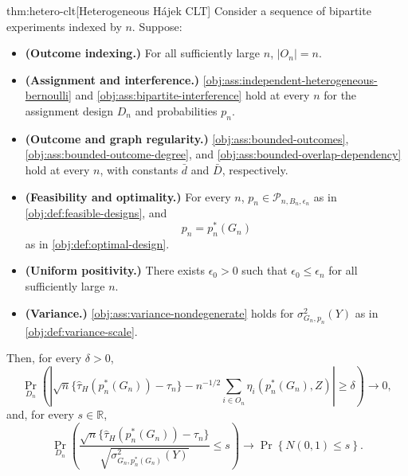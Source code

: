 \begin{theoremv}{thm:hetero-clt}[Heterogeneous Hájek CLT]
Consider a sequence of bipartite experiments indexed by $n$. Suppose:
\begin{itemize}
\item \textbf{(Outcome indexing.)} For all sufficiently large $n$, $|O_n|=n$.
\item \textbf{(Assignment and interference.)} \cref{obj:ass:independent-heterogeneous-bernoulli} and \cref{obj:ass:bipartite-interference} hold at every $n$ for the assignment design $D_n$ and probabilities $p_n$.
\item \textbf{(Outcome and graph regularity.)} \cref{obj:ass:bounded-outcomes}, \cref{obj:ass:bounded-outcome-degree}, and \cref{obj:ass:bounded-overlap-dependency} hold at every $n$, with constants $\bar d$ and $\bar D$, respectively.
\item \textbf{(Feasibility and optimality.)} For every $n$, $p_n\in\mathcal P_{n,B_n,\epsilon_n}$ as in \cref{obj:def:feasible-designs}, and
\[
p_n=p_n^*(G_n)
\]
as in \cref{obj:def:optimal-design}.
\item \textbf{(Uniform positivity.)} There exists $\epsilon_0>0$ such that $\epsilon_0\le\epsilon_n$ for all sufficiently large $n$.
\item \textbf{(Variance.)} \cref{obj:ass:variance-nondegenerate} holds for $\sigma^2_{G_n,p_n}(Y)$ as in \cref{obj:def:variance-scale}.
\end{itemize}
Then, for every $\delta>0$,
\[
\Pr_{D_n}\!\left(
\left|
\sqrt n\bigl\{\widehat\tau_H(p_n^*(G_n))-\tau_n\bigr\}
-n^{-1/2}\sum_{i\in O_n}\eta_i(p_n^*(G_n),Z)
\right|\ge\delta
\right)\longrightarrow 0,
\]
and, for every $s\in\mathbb R$,
\[
\Pr_{D_n}\!\left(
\frac{\sqrt n\bigl\{\widehat\tau_H(p_n^*(G_n))-\tau_n\bigr\}}
{\sqrt{\sigma^2_{G_n,p_n^*(G_n)}(Y)}}\le s
\right)
\longrightarrow
\Pr\!\left\{N(0,1)\le s\right\}.
\]
\end{theoremv}

